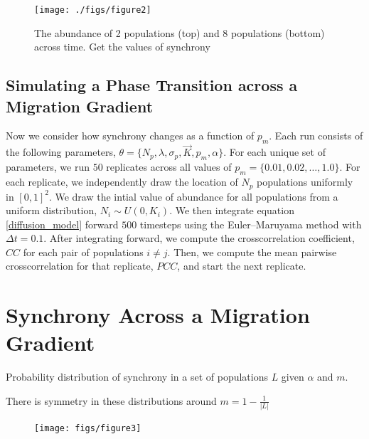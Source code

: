 \documentclass[]{article}
\begin{document}
\begin{figure}[h]
\texttt{[image: ./figs/figure2]}
\caption{The abundance of 2 populations (top) and 8 populations (bottom) across time. Get the values of synchrony }
\label{async_and_sync}

\end{figure}

\hypertarget{simulating-a-phase-transition-across-a-migration-gradient}{%
\subsection{Simulating a Phase Transition across a Migration
Gradient}\label{simulating-a-phase-transition-across-a-migration-gradient}}

Now we consider how synchrony changes as a function of \(p_m\). Each run
consists of the following parameters,
\(\theta = \{N_p, \lambda, \sigma_p, \vec{K},p_m, \alpha \}\). For each
unique set of parameters, we run \(50\) replicates across all values of
\(p_m = \{0.01,0.02,\dots,1.0 \}\). For each replicate, we independently
draw the location of \(N_p\)     populations uniformly in \([0,1]^2\). We
draw the intial value of abundance for all populations from a uniform
distribution, \(N_i \sim U(0, K_i)\). We then integrate equation
\ref{diffusion_model} forward \(500\) timesteps using the
Euler--Maruyama method with \(\Delta t=0.1\). After integrating forward,
we compute the crosscorrelation coefficient, \(CC\) for each pair of
populations \(i \neq j\). Then, we compute the mean pairwise
crosscorrelation for that replicate, \(PCC\), and start the next
replicate.


\hypertarget{phase-transitions-across-a-migration-gradient}{%
\section{Synchrony Across a Migration Gradient}\label{phase-transitions-across-a-migration-gradient}}

Probability distribution of synchrony in a set of populations $L$ given $\alpha$ and $m$.

There is symmetry in these distributions around $m = 1 - \frac{1}{|L|}$


\pagebreak
\begin{figure}[h]
    \texttt{[image: figs/figure3]}
    \caption{}
    \label{}
\end{figure}
\end{document}
